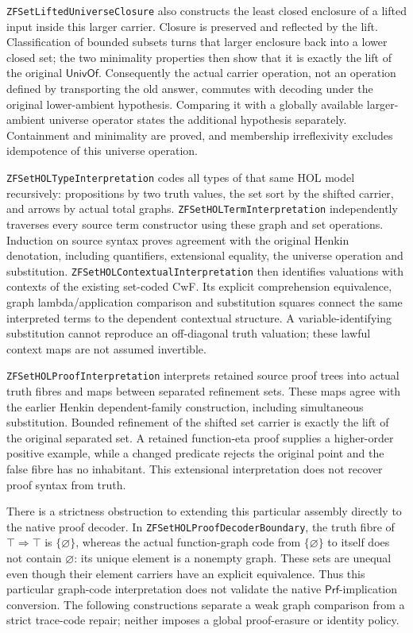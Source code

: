 \documentclass[11pt]{article}
\theoremstyle{definition}
\theoremstyle{remark}
\begin{document}
\nolinkurl{ZFSetLiftedUniverseClosure} also constructs the least closed
enclosure of a lifted input inside this larger carrier. Closure is preserved
and reflected by the lift. Classification of bounded subsets turns that
larger enclosure back into a lower closed set; the two minimality properties
then show that it is exactly the lift of the original \(\mathsf{UnivOf}\).
Consequently the actual carrier operation, not an operation defined by
transporting the old answer, commutes with decoding under the original
lower-ambient hypothesis. Comparing it with a globally available
larger-ambient universe operator states the additional hypothesis separately.
Containment and minimality are proved, and membership irreflexivity excludes
idempotence of this universe operation.

\nolinkurl{ZFSetHOLTypeInterpretation} codes all types of that same HOL
model recursively: propositions by two truth values, the set sort by the
shifted carrier, and arrows by actual total graphs.
\nolinkurl{ZFSetHOLTermInterpretation} independently traverses every source
term constructor using these graph and set operations. Induction on source
syntax proves agreement with the original Henkin denotation, including
quantifiers, extensional equality, the universe operation and substitution.
\nolinkurl{ZFSetHOLContextualInterpretation} then identifies valuations
with contexts of the existing set-coded CwF. Its explicit comprehension
equivalence, graph lambda/application comparison and substitution squares
connect the same interpreted terms to the dependent contextual structure.
A variable-identifying substitution cannot reproduce an off-diagonal truth
valuation; these lawful context maps are not assumed invertible.

\nolinkurl{ZFSetHOLProofInterpretation} interprets retained source proof
trees into actual truth fibres and maps between separated refinement sets.
These maps agree with the earlier Henkin dependent-family construction,
including simultaneous substitution. Bounded refinement of the shifted set
carrier is exactly the lift of the original separated set. A retained
function-eta proof supplies a higher-order positive example, while a changed
predicate rejects the original point and the false fibre has no inhabitant.
This extensional interpretation does not recover proof syntax from truth.

There is a strictness obstruction to extending this particular assembly
directly to the native proof decoder. In
\nolinkurl{ZFSetHOLProofDecoderBoundary}, the truth fibre of
\(\top\Rightarrow\top\) is \(\{\varnothing\}\), whereas the actual
function-graph code from \(\{\varnothing\}\) to itself does not contain
\(\varnothing\): its unique element is a nonempty graph. These sets are
unequal even though their element carriers have an explicit equivalence.
Thus this particular graph-code interpretation does not validate the native
\(\mathsf{Prf}\)-implication conversion. The following constructions
separate a weak graph comparison from a strict trace-code repair; neither
imposes a global proof-erasure or identity policy.
\end{document}
